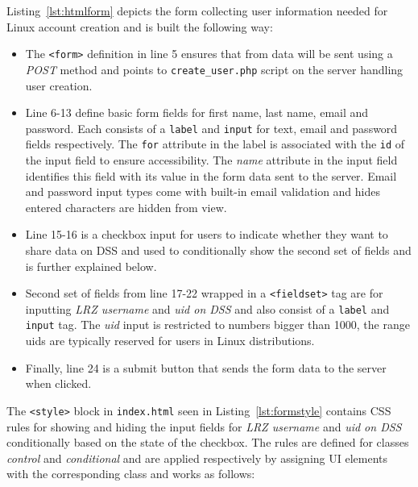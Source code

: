 Listing~\ref{lst:htmlform} depicts the form collecting user information needed
for Linux account creation and is built the following way:

\begin{itemize}
    \item The \texttt{<form>} definition in line 5 ensures that from data will
    be sent using a \textit{POST} method and points to \texttt{create\_user.php}
    script on the server handling user creation.
    \item Line 6-13 define basic form fields for first name, last name, email
    and password. Each consists of a \texttt{label} and \texttt{input} for text,
    email and password fields respectively. The \texttt{for} attribute in the
    label is associated with the \texttt{id} of the input field to ensure
    accessibility. The \textit{name} attribute in the input field identifies
    this field with its value in the form data sent to the server. Email and
    password input types come with built-in email validation and hides entered
    characters are hidden from view.
    \item Line 15-16 is a checkbox input for users to indicate whether they want
    to share data on DSS and used to conditionally show the second set of
    fields and is further explained below.
    \item Second set of fields from line 17-22 wrapped in a \texttt{<fieldset>}
    tag are for inputting \textit{LRZ username} and \textit{uid on DSS} and also
    consist of a \texttt{label} and \texttt{input} tag. The \textit{uid} input
    is restricted to numbers bigger than 1000, the range uids are typically
    reserved for users in Linux distributions.
    \item Finally, line 24 is a submit button that sends the form data to the
    server when clicked.
\end{itemize}



The \texttt{<style>} block in \texttt{index.html} seen in
Listing~\ref{lst:formstyle} contains CSS rules for showing and hiding the input
fields for \textit{LRZ username} and \textit{uid on DSS} conditionally based on
the state of the checkbox. The rules are defined for classes \textit{control}
and \textit{conditional} and are applied respectively by assigning UI elements
with the corresponding class and works as follows:

